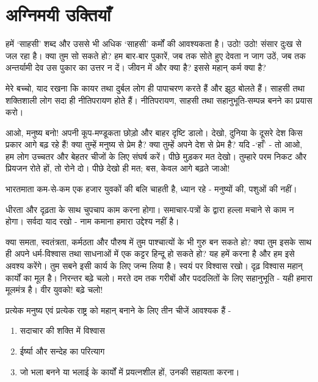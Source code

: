 
\chapter{अग्निमयी उक्तियाँ }



हमें ‘साहसी’ शब्द और उससे भी अधिक ‘साहसी’ कर्मों की आवश्यकता है। उठो! उठो! संसार दुःख से जल रहा है। क्या तुम सो सकते हो? हम बार-बार पुकारें, जब तक सोते हुए देवता न जाग उठें, जब तक अन्तर्यामी देव उस पुकार का उत्तर न दें। जीवन में और क्या है? इससे महान् कर्म क्या है? 

मेरे बच्चो, याद रखना कि कायर तथा दुर्बल लोग ही पापाचरण करते हैं और झूठ बोलते हैं। साहसी तथा शक्तिशाली लोग सदा ही नीतिपरायण होते हैं। नीतिपरायण, साहसी तथा सहानुभूति-सम्पन्न बनने का प्रयास करो।

आओ, मनुष्य बनो! अपनी कूप-मण्डूकता छोड़ो और बाहर दृष्टि डालो। देखो, दुनिया के दूसरे देश किस प्रकार आगे बढ़ रहे हैं! क्या तुम्हें मनुष्य से प्रेम है? क्या तुम्हें अपने देश से प्रेम है? यदि -‘हाँ’ - तो आओ, हम लोग उच्चतर और बेहतर चीजों के लिए संघर्ष करें। पीछे मुड़कर मत देखो। तुम्हारे परम निकट और प्रियजन रोते हों, तो रोने दो। पीछे देखो ही मत; बस, केवल आगे बढ़ते जाओ! 

भारतमाता कम-से-कम एक हजार युवकों की बलि चाहती है, ध्यान रहे - मनुष्यों की, पशुओं की नहीं। 

धीरता और दृढ़ता के साथ चुपचाप काम करना होगा। समाचार-पत्रों के द्वारा हल्ला मचाने से काम न होगा। सर्वदा याद रखो - नाम कमाना हमारा उद्देश्य नहीं है। 

क्या समता, स्वतंत्रता, कर्मठता और पौरुष में तुम पाश्चात्यों के भी गुरु बन सकते हो? क्या तुम इसके साथ ही अपने धर्म-विश्वास तथा साधनाओं में एक कट्टर हिन्दू हो सकते हो? यह हमें करना है और हम इसे अवश्य करेंगे। तुम सबने इसी कार्य के लिए जन्म लिया है। स्वयं पर विश्वास रखो। दृढ़ विश्वास महान् कार्यों का मूल है। निरन्तर बढ़े चलो। मरते दम तक गरीबों और पददलितों के लिए सहानुभूति - यही हमारा मूलमंत्र है। वीर युवको! बढ़े चलो! 

प्रत्येक मनुष्य एवं प्रत्येक राष्ट्र को महान् बनाने के लिए तीन चीजें आवश्यक हैं -

\begin{enumerate}
\item सदाचार की शक्ति में विश्वास 

 \item ईर्ष्या और सन्देह का परित्याग 

 \item जो भला बनने या भलाई के कार्यों में प्रयत्नशील हों, उनकी सहायता करना। 

\end{enumerate}

